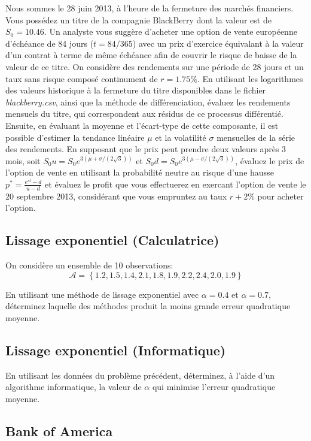 \documentclass[11pt,english,francais]{article}
\begin{document}
Nous sommes le 28 juin 2013, à l'heure de la fermeture des marchés
financiers. Vous possédez un titre de la compagnie BlackBerry dont la
valeur est de $S_0 = 10.46$. Un analyste vous suggère d'acheter une
option de vente européenne d'échéance de 84 jours ($t=84/365$) avec un prix d'exercice
équivalant à la valeur d'un contrat à terme de même échéance afin de
couvrir le risque de baisse de la valeur de ce titre. On considère des
rendements sur une période de 28 jours et un taux sans risque composé
continument de $r=1.75\%$.  En utilisant les logarithmes des valeurs
historique à la fermeture du titre disponibles dans le fichier
\emph{blackberry.csv}, ainsi que la méthode de différenciation,
évaluez les rendements mensuels du titre, qui correspondent aux
résidus de ce processus différentié. Ensuite, en évaluant la moyenne
et l'écart-type de cette composante, il est possible d'estimer la
tendance linéaire $\mu$ et la volatilité $\sigma$ mensuelles de la
série des rendements. En supposant que le prix peut prendre deux
valeurs après 3 mois, soit $S_0u = S_0 e^{3(\mu+\sigma/(2\sqrt{3}))}$
et $S_0d = S_0 e^{3(\mu-\sigma/(2\sqrt{3}))}$, évaluez le prix de
l'option de vente en utilisant la probabilité neutre au risque d'une
hausse $p^{*} = \frac{e^{rt}-d}{u-d}$ et évaluez le profit que vous
effectuerez en exercant l'option de vente le 20 septembre 2013,
considérant que vous empruntez au taux $r+2\%$ pour acheter l'option.

\subsection{Lissage exponentiel (Calculatrice)}

On considère un ensemble de 10 observations:
\[
\mathcal{A}=\left\{1.2,1.5,1.4,2.1,1.8,1.9,2.2,2.4,2.0,1.9 \right\}
\]

En utilisant une méthode de lissage exponentiel avec $\alpha=0.4$ et
$\alpha=0.7$, déterminez laquelle des méthodes produit la moins grande
erreur quadratique moyenne.

\subsection{Lissage exponentiel (Informatique)}

En utilisant les données du problème précédent, déterminez, à l'aide
d'un algorithme informatique, la valeur de $\alpha$ qui minimise
l'erreur quadratique moyenne.

\subsection{Bank of America}
\end{document}
